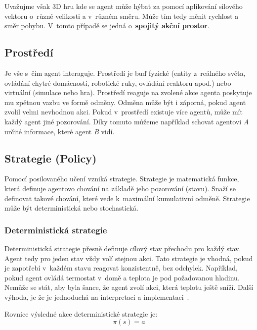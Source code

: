 \bigskip

Uvažujme však 3D hru kde se agent může hýbat za pomocí aplikování silového vektoru o~různé velikosti a v~různém směru.
Může tím tedy měnit rychlost a směr pohybu.
V~tomto případě se jedná o~\textbf{spojitý akční prostor}.

\subsection{Prostředí}\label{subsec:prostredi2}

Je vše s~čím agent interaguje.
Prostředí je buď fyzické (entity z~reálného světa, ovládání chytré domácnosti, robotické ruky, ovládání reaktoru apod.) nebo virtuální (simulace nebo hra).
Prostředí reaguje na zvolené akce agenta poskytuje mu zpětnou vazbu ve formě odměny.
Odměna může být i záporná, pokud agent zvolil velmi nevhodnou akci.
Pokud v~prostředí existuje více agentů, může mít každý agent jiné pozorování.
Díky tomuto můžeme například schovat agentovi \textit{A} určité informace, které agent \textit{B} vidí.

\subsection{Strategie (Policy)}\label{subsec:strategie}

Pomocí posilovaného učení vzniká strategie.
Strategie je matematická funkce, která definuje agentovo chování na základě jeho pozorování (stavu).
Snaží se definovat takové chování, které vede k~maximální kumulativní odměně.
Strategie může být deterministická nebo stochastická.

  \subsubsection*{Deterministická strategie}
  
  Deterministická strategie přesně definuje cílový stav přechodu pro každý stav.
  Agent tedy pro jeden stav vždy volí stejnou akci.
  Tato strategie je vhodná, pokud je zapotřebí v~každém stavu reagovat konzistentně, bez odchylek.
  Například, pokud agent ovládá termostat v~domě a teplota je pod požadovanou hladinu.
  Nemůže se stát, aby byla šance, že agent zvolí akci, která teplotu ještě sníží.
  Další výhoda, je že je jednoduchá na interpretaci a implementaci~\cite{Policies}.

  Rovnice výsledné akce deterministické strategie je:
  \begin{equation}
    \pi(s) = a\label{eq:policy_deterministic}
  \end{equation}

